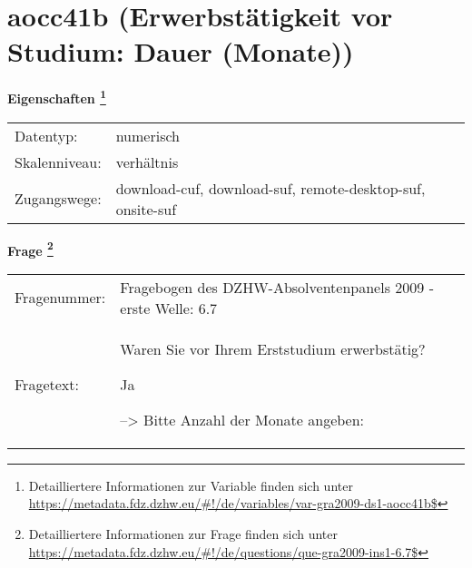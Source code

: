 
    \setcounter{footnote}{0}

    \vspace*{-1.8cm}
	\section{aocc41b (Erwerbstätigkeit vor Studium: Dauer (Monate))}
	\label{section:aocc41b}



    \vspace*{0.5cm}
    \noindent\textbf{Eigenschaften
	\footnote{Detailliertere Informationen zur Variable finden sich unter
		\url{https://metadata.fdz.dzhw.eu/\#!/de/variables/var-gra2009-ds1-aocc41b$}}}\\
	\begin{tabularx}{\hsize}{@{}lX}
	Datentyp: & numerisch \\
	Skalenniveau: & verhältnis \\
	Zugangswege: &
	  download-cuf, 
	  download-suf, 
	  remote-desktop-suf, 
	  onsite-suf
 \\
    \end{tabularx}



				\vspace*{0.5cm}
                \noindent\textbf{Frage
	                \footnote{Detailliertere Informationen zur Frage finden sich unter
		              \url{https://metadata.fdz.dzhw.eu/\#!/de/questions/que-gra2009-ins1-6.7$}}}\\
				\begin{tabularx}{\hsize}{@{}lX}
					Fragenummer: &
					  Fragebogen des DZHW-Absolventenpanels 2009 - erste Welle:
					  6.7
 \\
					Fragetext: & Waren Sie vor Ihrem Erststudium erwerbstätig?\par  Ja\par  --\textgreater{} Bitte Anzahl der Monate angeben: \\
				\end{tabularx}





